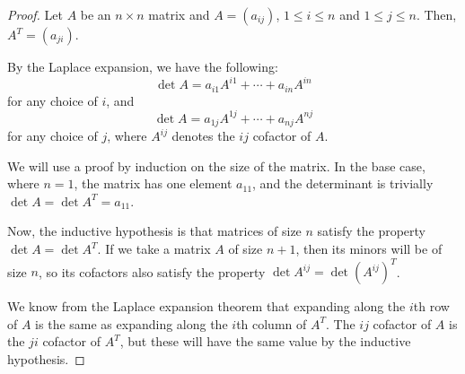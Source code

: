 \documentclass{article}
\begin{document}
\begin{proof}
    Let $A$ be an $n \times n$ matrix and $A = (a_{ij})$, $1 \leq i \leq n$ and $1 \leq j \leq n$.
    Then, $A^T = (a_{ji})$.

    By the Laplace expansion, we have the following:
    \begin{equation*}
        \det A = a_{i1}A^{i1} + \cdots + a_{in}A^{in}
    \end{equation*}
    for any choice of $i$, and
    \begin{equation*}
        \det A = a_{1j}A^{1j} + \cdots + a_{nj}A^{nj}
    \end{equation*}
    for any choice of $j$, where $A^{ij}$ denotes the $ij$ cofactor of $A$.

    We will use a proof by induction on the size of the matrix.
    In the base case, where $n = 1$, the matrix has one element $a_{11}$, and the determinant is trivially $\det A = \det{A^T} = a_{11}$.

    Now, the inductive hypothesis is that matrices of size $n$ satisfy the property $\det A = \det {A^T}$.
    If we take a matrix $A$ of size $n+1$, then its minors will be of size $n$, so its cofactors also satisfy the property $\det A^{ij} = \det {(A^{ij})^T}$.

    We know from the Laplace expansion theorem that expanding along the $i$th row of $A$ is the same as expanding along the $i$th column of $A^T$.
    The $ij$ cofactor of $A$ is the $ji$ cofactor of $A^T$, but these will have the same value by the inductive hypothesis.
\end{proof}
\end{document}
